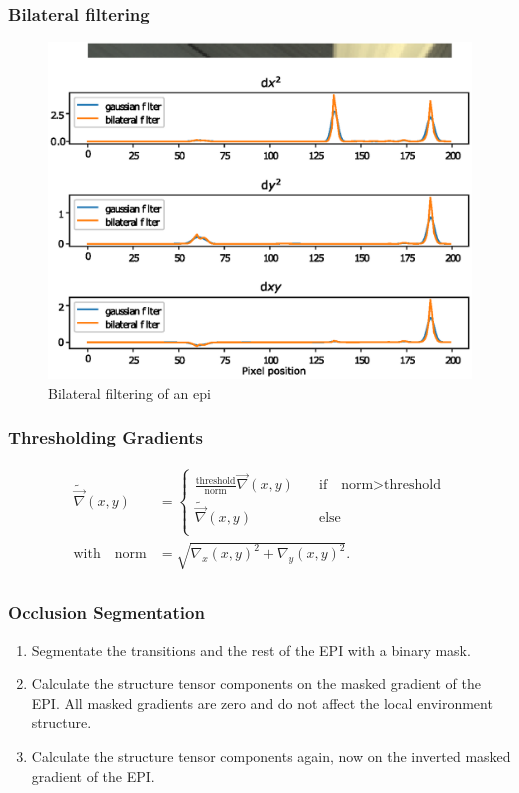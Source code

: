 \documentclass[11pt]{beamer}
\begin{document}
\begin{frame}
\frametitle{Bilateral filtering}
\begin{figure}
	\centering
	\includegraphics[width=0.7\linewidth]{images/bilat}
	\caption[Bilateral filtering]{Bilateral filtering of an epi}
	\label{fig:bilat}
\end{figure}
\end{frame}

\begin{frame}
\frametitle{Thresholding Gradients}
\begin{align}
\tilde{\vec \nabla}(x,y) &= \begin{cases}
\frac{\text{threshold}}{\text{norm}} \vec \nabla(x,y) \quad &\text{if}\quad \text{norm}> \text{threshold}\\
\tilde{\vec \nabla}(x,y)\qquad &\text{else}\\
\end{cases} \\
\text{with} \quad \text{norm} &= \sqrt{\nabla_x(x,y)^2 + \nabla_y(x,y)^2}.\\
\end{align}
\end{frame}

\begin{frame}
\frametitle{Occlusion Segmentation}
\begin{enumerate}
	\item Segmentate the transitions and the rest of the EPI with a binary mask.
	\item Calculate the structure tensor components on the masked gradient of the EPI. All masked gradients are zero and do not affect the local environment structure.
	\item Calculate the structure tensor components again, now on the inverted masked gradient of the EPI.
\end{enumerate}
\end{frame}
\end{document}
